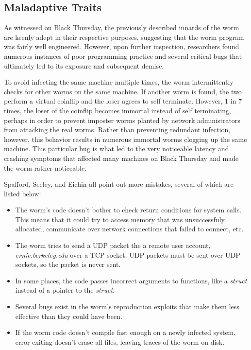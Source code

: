 \subsection*{Maladaptive Traits}
As witnessed on Black Thursday, the previously described innards of the worm are
keenly adept in their respective purposes, suggesting that the worm program was
fairly well engineered. However, upon further inspection, researchers found
numerous instances of poor programming practice and several critical
bugs that ultimately led to its exposure and subsequent demise.

To avoid infecting the same machine multiple times, the worm 
intermittently checks for other worms on the same machine. If another worm is
found, the two perform a virtual coinflip and the loser agrees to self
terminate.
However, 1 in 7 times, the loser of the coinflip becomes immortal instead of
self terminating, perhaps in order to prevent imposter worms planted by network
administrators from attacking the real worms\cite{spafford_internet_1989}.
Rather than preventing redundant infection, however, this behavior results in
numerous immortal worms clogging up the same machine. This particular bug is
what led to the very noticeable latency and crashing symptoms that affected many
machines on Black Thursday and made the worm rather noticeable.

Spafford\cite{spafford_internet_1989}, Seeley\cite{seeley_tour_1989}, and
Eichin\cite{eichin_microscope_1989} all point out more mistakes, several of
which are listed below:
\begin{itemize}
\item The worm's code doesn't bother to check return conditions for system
calls. This means that it could try to access memory that was
unsuccessfuly allocated, communicate over network connections that failed to
connect, etc. 
\item The worm tries to send a UDP packet the a remote user account,
\textit{ernie.berkeley.edu} over a TCP socket. UDP packets must be sent
over UDP sockets, so the packet is never sent.
\item In some places, the code passes incorrect arguments to functions, like a
\textit{struct} instead of a pointer to the \textit{struct}.
\item Several bugs exist in the worm's reproduction exploits that make them
less effective than they could have been. 
\item If the worm code doesn't compile fast enough on a newly infected system,
error exiting doesn't erase all files, leaving traces of the worm on
disk.
\end{itemize}

